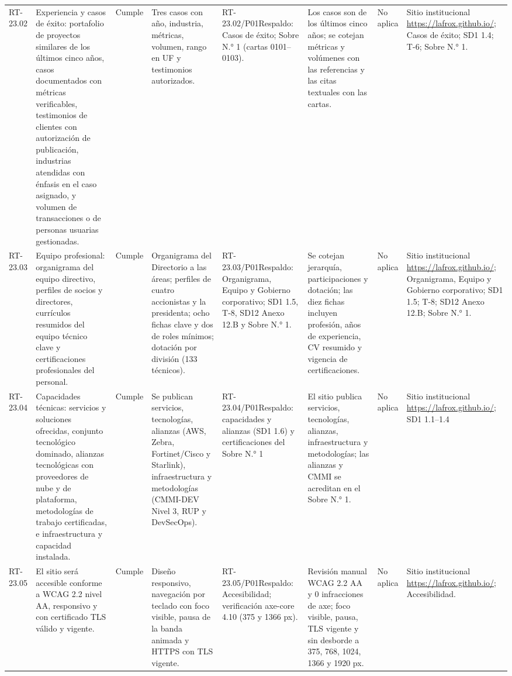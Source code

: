 \documentclass[oficio,firma,final]{lafrox}
\begin{document}
\begin{landscape}
{\begin{longtable}{@{}F{0.054} F{0.173} F{0.061} F{0.191} F{0.106} F{0.180} F{0.067} F{0.168}@{}}
  RT-23.02 & Experiencia y casos de éxito: portafolio de proyectos similares de los últimos cinco años, casos documentados con métricas verificables, testimonios de clientes con autorización de publicación, industrias atendidas con énfasis en el caso asignado, y volumen de transacciones o de personas usuarias gestionadas. & Cumple & Tres casos con año, industria, métricas, volumen, rango en UF y testimonios autorizados. & RT-23.02/\allowbreak{}P01\newline Respaldo: Casos de éxito; Sobre N.° 1 (cartas 0101--0103). & Los casos son de los últimos cinco años; se cotejan métricas y volúmenes con las referencias y las citas textuales con las cartas. & No aplica & Sitio institucional \url{https://lafrox.github.io/}; Casos de éxito; SD1 1.4; T-6; Sobre N.° 1.  \\
  RT-23.03 & Equipo profesional: organigrama del equipo directivo, perfiles de socios y directores, currículos resumidos del equipo técnico clave y certificaciones profesionales del personal. & Cumple & Organigrama del Directorio a las áreas; perfiles de cuatro accionistas y la presidenta; ocho fichas clave y dos de roles mínimos; dotación por división (133 técnicos). & RT-23.03/\allowbreak{}P01\newline Respaldo: Organigrama, Equipo y Gobierno corporativo; SD1 1.5, T-8, SD12 Anexo 12.B y Sobre N.° 1. & Se cotejan jerarquía, participaciones y dotación; las diez fichas incluyen profesión, años de experiencia, CV resumido y vigencia de certificaciones. & No aplica & Sitio institucional \url{https://lafrox.github.io/}; Organigrama, Equipo y Gobierno corporativo; SD1 1.5; T-8; SD12 Anexo 12.B; Sobre N.° 1.  \\
  RT-23.04 & Capacidades técnicas: servicios y soluciones ofrecidas, conjunto tecnológico dominado, alianzas tecnológicas con proveedores de nube y de plataforma, metodologías de trabajo certificadas, e infraestructura y capacidad instalada. & Cumple & Se publican servicios, tecnologías, alianzas (AWS, Zebra, Fortinet/Cisco y Starlink), infraestructura y metodologías (CMMI-DEV Nivel 3, RUP y DevSecOps). & RT-23.04/\allowbreak{}P01\newline Respaldo: capacidades y alianzas (SD1 1.6) y certificaciones del Sobre N.° 1 & El sitio publica servicios, tecnologías, alianzas, infraestructura y metodologías; las alianzas y CMMI se acreditan en el Sobre N.° 1. & No aplica & Sitio institucional \url{https://lafrox.github.io/}; SD1 1.1–1.4  \\
  RT-23.05 & El sitio será accesible conforme a WCAG 2.2 nivel AA, responsivo y con certificado TLS válido y vigente. & Cumple & Diseño responsivo, navegación por teclado con foco visible, pausa de la banda animada y HTTPS con TLS vigente. & RT-23.05/\allowbreak{}P01\newline Respaldo: Accesibilidad; verificación axe-core 4.10 (375 y 1366 px). & Revisión manual WCAG 2.2 AA y 0 infracciones de axe; foco visible, pausa, TLS vigente y sin desborde a 375, 768, 1024, 1366 y 1920 px. & No aplica & Sitio institucional \url{https://lafrox.github.io/}; Accesibilidad.  \\

\end{longtable}}
\end{landscape}
\end{document}
